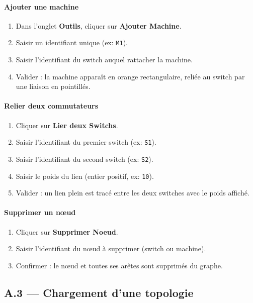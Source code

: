 \documentclass[12pt, a4paper]{article}
\begin{document}
\paragraph{Ajouter une machine}
\begin{enumerate}
    \item Dans l'onglet \textbf{Outils}, cliquer sur \textbf{Ajouter Machine}.
    \item Saisir un identifiant unique (ex: \texttt{M1}).
    \item Saisir l'identifiant du switch auquel rattacher la machine.
    \item Valider : la machine apparaît en orange rectangulaire, reliée au switch par une liaison en pointillés.
\end{enumerate}

\paragraph{Relier deux commutateurs}
\begin{enumerate}
    \item Cliquer sur \textbf{Lier deux Switchs}.
    \item Saisir l'identifiant du premier switch (ex: \texttt{S1}).
    \item Saisir l'identifiant du second switch (ex: \texttt{S2}).
    \item Saisir le poids du lien (entier positif, ex: \texttt{10}).
    \item Valider : un lien plein est tracé entre les deux switches avec le poids affiché.
\end{enumerate}

\paragraph{Supprimer un nœud}
\begin{enumerate}
    \item Cliquer sur \textbf{Supprimer Noeud}.
    \item Saisir l'identifiant du nœud à supprimer (switch ou machine).
    \item Confirmer : le nœud et toutes ses arêtes sont supprimés du graphe.
\end{enumerate}

\subsection*{A.3 --- Chargement d'une topologie}
\end{document}
